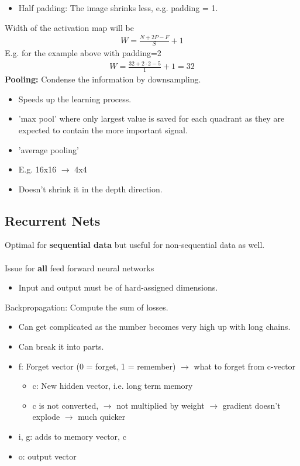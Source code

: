 \begin{multicols}{2}
\begin{itemize}
  \item Half padding: The image shrinks less, e.g. padding = 1.
\end{itemize}
Width of the activation map will be
\begin{align*}
  W=\frac{N+2P-F}{S}+1
\end{align*}
E.g. for the example above with padding=2
\begin{align*}
 W=\frac{32+2\cdot2-5}{1}+1=32
\end{align*}
\textbf{Pooling:} Condense the information by downsampling.
\begin{itemize}
  \item Speeds up the learning process.
  \item 'max pool' where only largest value is saved for each quadrant as they are expected to contain the more important signal.
  \item 'average pooling'
  \item E.g. 16x16 $\rightarrow$ 4x4
  \item Doesn't shrink it in the depth direction.
\end{itemize}

\end{multicols}

\subsection{Recurrent Nets}
\begin{multicols}{2}
Optimal for \textbf{sequential data} but useful for non-sequential data as well.
\\ \\
Issue for \textbf{all} feed forward neural networks
\begin{itemize}
  \item Input and output must be of hard-assigned dimensions.
\end{itemize}
Backpropagation: Compute the sum of losses.
\begin{itemize}
  \item Can get complicated as the number becomes very high up with long chains.
  \item Can break it into parts.
\end{itemize}

\begin{itemize}
  \item f: Forget vector (0 = forget, 1 = remember) $\rightarrow$ what to forget from c-vector
  \begin{itemize}
    \item c: New hidden vector, i.e. long term memory
    \item c is not converted, $\rightarrow$ not multiplied by weight $\rightarrow$ gradient doesn't explode $\rightarrow$ much quicker
  \end{itemize}
  \item i, g: adds to memory vector, c
  \item o: output vector
\end{itemize}



\end{multicols}

